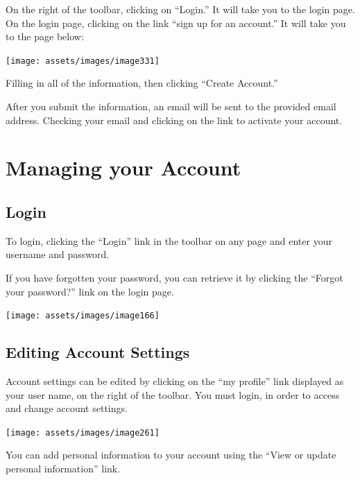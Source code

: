 \documentclass[
  12pt,
]{book}
\begin{document}
On the right of the toolbar, clicking on ``Login.'' It will take you to the login page. On the login page, clicking on the link ``sign up for an account.'' It will take you to the page below:

\begin{center}\texttt{[image: assets/images/image331]} \end{center}

Filling in all of the information, then clicking ``Create Account.''

After you submit the information, an email will be sent to the provided email address. Checking your email and clicking on the link to activate your account.

\hypertarget{managing-your-account}{%
\section{Managing your Account}\label{managing-your-account}}

\hypertarget{login}{%
\subsection{Login}\label{login}}

To login, clicking the ``Login'' link in the toolbar on any page and enter your username and password.

If you have forgotten your password, you can retrieve it by clicking the ``Forgot your password?'' link on the login page.

\begin{center}\texttt{[image: assets/images/image166]} \end{center}

\hypertarget{editing-account-settings}{%
\subsection{Editing Account Settings}\label{editing-account-settings}}

Account settings can be edited by clicking on the ``my profile'' link displayed as your user name, on the right of the toolbar. You must login, in order to access and change account settings.

\begin{center}\texttt{[image: assets/images/image261]} \end{center}

You can add personal information to your account using the ``View or update personal information'' link.
\end{document}

